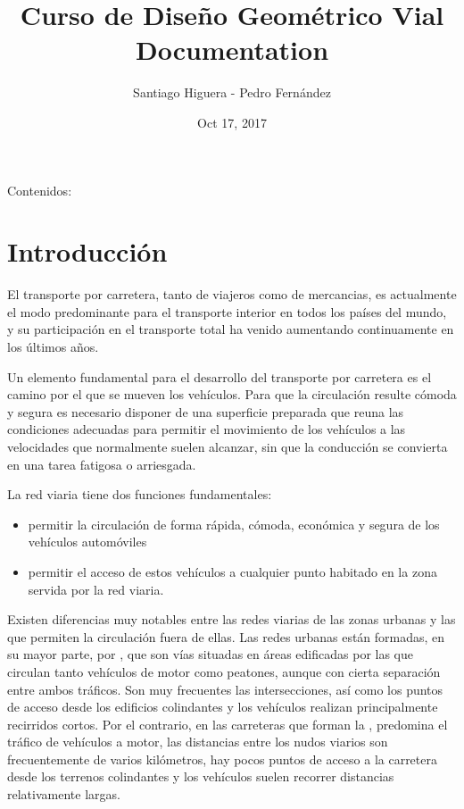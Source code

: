 \documentclass[letterpaper,10pt,english]{sphinxmanual}
\title{Curso de Diseño Geométrico Vial Documentation}
\date{Oct 17, 2017}
\author{Santiago Higuera - Pedro Fernández}
\begin{document}
\maketitle
\sphinxtableofcontents
{}\label{\detokenize{index::doc}}


Contenidos:


\chapter{Introducción}
\label{\detokenize{intro::doc}}\label{\detokenize{intro:documentacion-del-curso-de-diseno-geometrico-vial}}\label{\detokenize{intro:introduccion}}
El transporte por carretera, tanto de viajeros como de mercancias, es actualmente el modo predominante para el transporte interior en todos los países del mundo, y su participación en el transporte total ha venido aumentando continuamente en los últimos años.

Un elemento fundamental para el desarrollo del transporte por carretera es el camino por el que se mueven los vehículos. Para que la circulación resulte cómoda y segura es necesario disponer de una superficie preparada que reuna las condiciones adecuadas para permitir el movimiento de los vehículos a las velocidades que normalmente suelen alcanzar, sin que la conducción se convierta en una tarea fatigosa o arriesgada.

La red viaria tiene dos funciones fundamentales:
\begin{itemize}
\item {} 
 permitir la circulación de forma rápida, cómoda, económica y segura de los vehículos automóviles

\item {} 
 permitir el acceso de estos vehículos a cualquier punto habitado en la zona servida por la red viaria.

\end{itemize}

Existen diferencias muy notables entre las redes viarias de las zonas urbanas y las que permiten la circulación fuera de ellas. Las redes urbanas están formadas, en su mayor parte, por , que son vías situadas en áreas edificadas por las que circulan tanto vehículos de motor como peatones, aunque con cierta separación entre ambos tráficos. Son muy frecuentes las intersecciones, así como los puntos de acceso desde los edificios colindantes y los vehículos realizan principalmente recirridos cortos. Por el contrario, en las carreteras que forman la , predomina el tráfico de vehículos a motor, las distancias entre los nudos viarios son frecuentemente de varios kilómetros, hay pocos puntos de acceso a la carretera desde los terrenos colindantes y los vehículos suelen recorrer distancias relativamente largas.
\end{document}
